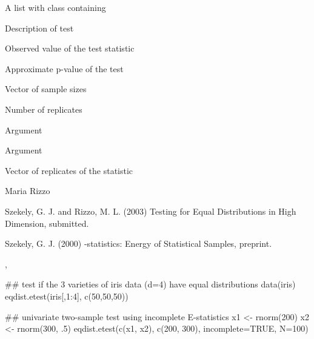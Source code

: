 \documentclass{article}
\begin{document}
\begin{Value}
A list with class  containing
\begin{ldescription}
\item[\code{method}] Description of test
\item[\code{statistic}] Observed value of the test statistic
\item[\code{p.value}] Approximate p-value of the test
\item[\code{sizes}] Vector of sample sizes
\item[\code{R}] Number of replicates
\item[\code{incomplete}] Argument 
\item[\code{N}] Argument 
\item[\code{replicates}] Vector of replicates of the statistic
\end{ldescription}
\end{Value}
\begin{Author}\relax
Maria Rizzo 
\end{Author}
\begin{References}\relax
Szekely, G. J. and Rizzo, M. L. (2003) Testing for Equal
Distributions in High Dimension, submitted.

Szekely, G. J. (2000) -statistics: Energy of 
Statistical Samples, preprint.\end{References}
\begin{SeeAlso}\relax
{},
\end{SeeAlso}
\begin{Examples}
\begin{ExampleCode}
 ## test if the 3 varieties of iris data (d=4) have equal distributions
 data(iris)
 eqdist.etest(iris[,1:4], c(50,50,50))
 
 ## univariate two-sample test using incomplete E-statistics
 x1 <- rnorm(200)
 x2 <- rnorm(300, .5)
 eqdist.etest(c(x1, x2), c(200, 300), incomplete=TRUE, N=100)
\end{ExampleCode}
\end{Examples}
\end{document}
